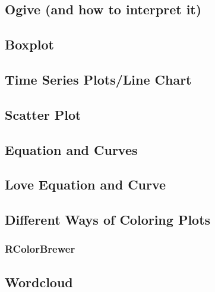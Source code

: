 \documentclass[
]{book}
\begin{document}
\hypertarget{ogive-and-how-to-interpret-it}{%
\subsection{Ogive (and how to interpret it)}\label{ogive-and-how-to-interpret-it}}

\hypertarget{boxplot}{%
\subsection{Boxplot}\label{boxplot}}

\hypertarget{time-series-plotsline-chart}{%
\subsection{Time Series Plots/Line Chart}\label{time-series-plotsline-chart}}

\hypertarget{scatter-plot}{%
\subsection{Scatter Plot}\label{scatter-plot}}

\hypertarget{equation-and-curves}{%
\subsection{Equation and Curves}\label{equation-and-curves}}

\hypertarget{love-equation-and-curve}{%
\subsection{Love Equation and Curve}\label{love-equation-and-curve}}

\hypertarget{different-ways-of-coloring-plots}{%
\subsection{Different Ways of Coloring Plots}\label{different-ways-of-coloring-plots}}

\hypertarget{rcolorbrewer}{%
\subsubsection{RColorBrewer}\label{rcolorbrewer}}

\hypertarget{wordcloud}{%
\subsection{Wordcloud}\label{wordcloud}}
\end{document}
